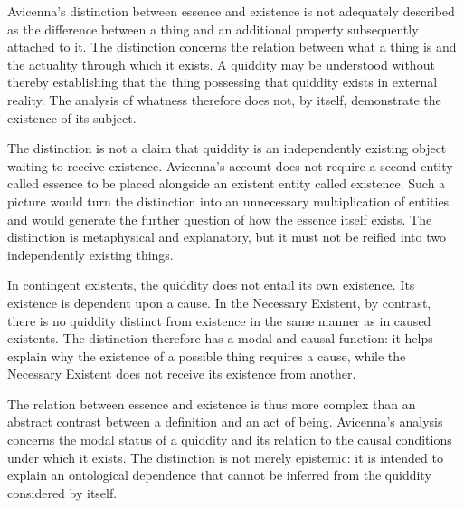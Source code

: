 \label{para:VS.B01.P01.C08.S13.SS05.P001}

Avicenna's distinction between essence
and existence is not adequately described
as the difference between a thing and
an additional property subsequently
attached to it. The distinction concerns
the relation between what a thing is
and the actuality through which it
exists. A quiddity may be understood
without thereby establishing that
the thing possessing that quiddity
exists in external reality. The
analysis of whatness therefore does
not, by itself, demonstrate the
existence of its subject.
\citep[Ilahiyyat, I.5--6; V.1]{AvicennaMetaphysics}

\label{para:VS.B01.P01.C08.S13.SS05.P002}

The distinction is not a claim that
quiddity is an independently existing
object waiting to receive existence.
Avicenna's account does not require
a second entity called essence to
be placed alongside an existent
entity called existence. Such a
picture would turn the distinction
into an unnecessary multiplication
of entities and would generate
the further question of how the
essence itself exists. The
distinction is metaphysical and
explanatory, but it must not be
reified into two independently
existing things.
\citep[Ilahiyyat, V.1 and VIII.4]{AvicennaMetaphysics}

\label{para:VS.B01.P01.C08.S13.SS05.P003}

In contingent existents, the quiddity
does not entail its own existence.
Its existence is dependent upon
a cause. In the Necessary Existent,
by contrast, there is no quiddity
distinct from existence in the
same manner as in caused existents.
The distinction therefore has
a modal and causal function: it
helps explain why the existence
of a possible thing requires
a cause, while the Necessary
Existent does not receive its
existence from another.
\citep[Ilahiyyat, I.6--7; VIII.4]{AvicennaMetaphysics}

\label{para:VS.B01.P01.C08.S13.SS05.P004}

The relation between essence and
existence is thus more complex
than an abstract contrast between
a definition and an act of being.
Avicenna's analysis concerns the
modal status of a quiddity and
its relation to the causal conditions
under which it exists. The
distinction is not merely epistemic:
it is intended to explain an
ontological dependence that
cannot be inferred from the
quiddity considered by itself.
\citep[Ilahiyyat, I.5--7; VIII.1--4]{AvicennaMetaphysics}

